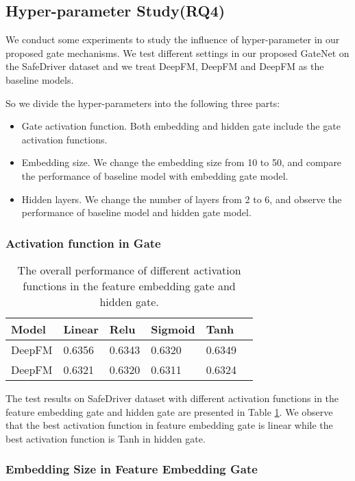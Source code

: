 \documentclass[sigconf,nonacm=true]{acmart}
\begin{document}
\subsection{Hyper-parameter Study(RQ4)}
We conduct some experiments to study the influence of hyper-parameter in our proposed gate mechanisms.
We test different settings in our proposed GateNet on the SafeDriver dataset and 
we treat DeepFM, DeepFM and DeepFM as the baseline models.

So we divide the hyper-parameters into the following three parts: 
\begin{itemize}
  \item Gate activation function. Both embedding and hidden gate include the gate activation functions.
  \item Embedding size. We change the embedding size from 10 to 50, and compare the performance of baseline model with embedding gate model.
  \item Hidden layers. We change the number of layers from 2 to 6, and observe the performance of baseline model and hidden gate model.
\end{itemize}

\subsubsection{Activation function in Gate}
\begin{table}[!htbp]
  \centering
  \caption{The overall performance of different activation functions in the feature embedding gate and hidden gate.}
  \label{table:t6}
  \begin{tabular}{llllll}
    Model & Linear & Relu & Sigmoid & Tanh\\ \hline
    DeepFM & 0.6356 & 0.6343 & 0.6320 & 0.6349  \\
    DeepFM & 0.6321 & 0.6320 & 0.6311 & 0.6324  \tabularnewline \bottomrule
\end{tabular}
\end{table}
The test results on SafeDriver dataset with different activation functions in the feature embedding gate and hidden gate are presented in Table \ref{table:t6}.
We observe that the best activation function in feature embedding gate is linear while the best activation function is Tanh in hidden gate.

\subsubsection{Embedding Size in Feature Embedding Gate}
\end{document}
